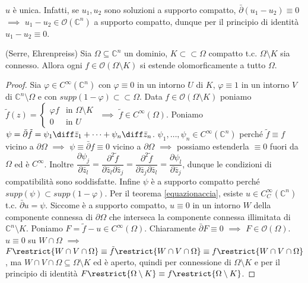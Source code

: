\begin{oss}
  $u$ è unica. Infatti, se $u_1, u_2$ sono soluzioni a supporto compatto, $\bar{\partial}(u_1-u_2) \equiv 0$ $\implies$ $u_1-u_2 \in \mathcal{O}(\mathbb{C}^n)$ a supporto compatto, dunque per il principio di identità $u_1-u_2 \equiv 0$.
\end{oss}

\begin{thm}
  (Serre, Ehrenpreiss) Sia $\Omega \subseteq \mathbb{C}^n$ un dominio, $K \subset \subset \Omega$ compatto t.c. $\Omega \setminus K$ sia connesso. Allora ogni $f \in \mathcal{O}(\Omega\setminus K)$ si estende olomorficamente a tutto $\Omega$.
\end{thm}

\begin{proof}
  Sia $\varphi \in C^{\infty}(\mathbb{C}^n)$ con $\varphi \equiv 0$ in un intorno $U$ di $K$, $\varphi \equiv 1$ in un intorno $V$ di $\mathbb{C}^n\setminus \Omega$ e con $supp(1-\varphi) \subset \subset \Omega$.
  Data $f \in \mathcal{O}(\Omega\setminus K)$ poniamo $\tilde{f}(z)=\begin{cases} \varphi f & \mbox{in }\Omega\setminus K \\ 0 & \mbox{in }U\end{cases}$ $\implies$ $\tilde{f} \in C^{\infty}(\Omega)$.
  Poniamo $\psi=\bar{\partial}\tilde{f}=\psi_1\diff\bar{z}_1+\dots+\psi_n\diff\bar{z}_n$.
  $\psi_1, \dots, \psi_n \in C^{\infty}(\mathbb{C}^n)$ perché $\tilde{f}\equiv f$ vicino a $\partial\Omega$ $\implies$ $\psi \equiv \bar{\partial} f\equiv 0$ vicino a $\partial\Omega$ $\implies$ possiamo estenderla $\equiv 0$ fuori da $\Omega$ ed è $C^\infty$.
  Inoltre $\dfrac{\partial \psi_j}{\partial \bar{z}_l}=\dfrac{\partial^2 \tilde{f}}{\partial\bar{z}_l\partial\bar{z}_j}=\dfrac{\partial^2 \tilde{f}}{\partial\bar{z}_j\partial\bar{z}_l}=\dfrac{\partial \psi_l}{\partial \bar{z}_j}$, dunque le condizioni di compatibilità sono soddisfatte.
  Infine $\psi$ è a supporto compatto perché $supp(\psi) \subset supp(1-\varphi)$. Per il teorema \ref{equazionaccia}, esiste $u \in C^{\infty}_C(\mathbb{C}^n)$ t.c. $\bar{\partial}u=\psi$. Siccome è a supporto compatto, $u \equiv 0$ in un intorno $W$ della componente connessa di $\partial\Omega$ che interseca la componente connessa illimitata di $\mathbb{C}^n\setminus K$.
  Poniamo $F=\tilde{f}-u \in C^{\infty}(\Omega)$. Chiaramente $\bar{\partial}F \equiv 0$ $\implies$ $F \in \mathcal{O}(\Omega)$.
  $u \equiv 0$ su $W \cap \Omega$ $\implies$ $F\restrict{W \cap V \cap \Omega}\equiv \tilde{f}\restrict{W \cap V \cap \Omega}\equiv f\restrict{W \cap V \cap \Omega}$, ma $W \cap V \cap \Omega \subseteq \Omega\setminus K$ ed è aperto, quindi per connessione di $\Omega \setminus K$ e per il principio di identità $F\restrict{\Omega\setminus K}\equiv f\restrict{\Omega \setminus K}$.
\end{proof}
